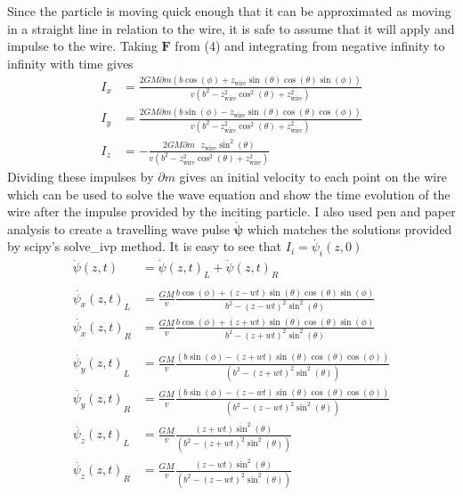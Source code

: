 \documentclass{report}
\begin{document}
Since the particle is moving quick enough that it can be approximated as moving in a straight line in relation
to the wire, it is safe to assume that it will apply and impulse to the wire. Taking $\mathbf{F}$ from (4) and 
integrating from negative infinity to infinity with time gives
\begin{align}
    I_x &= \frac{2 G M \partial m (b \cos (\phi )+z_{\text{wire}} \sin (\theta ) \cos (\theta ) \sin (\phi ))}{v \left(b^2-z_{\text{wire}}^2 \cos ^2(\theta )+z_{\text{wire}}^2\right)}\\
    I_y &= \frac{2 G M \partial m (b \sin (\phi )-z_{\text{wire}} \sin (\theta ) \cos (\theta ) \cos (\phi ))}{v \left(b^2-z_{\text{wire}}^2 \cos ^2(\theta )+z_{\text{wire}}^2\right)}\\
    I_z &= -\frac{2 G M \partial m \text{ } z_{\text{wire}} \sin ^2(\theta )}{v \left(b^2-z_{\text{wire}}^2 \cos ^2(\theta )+z_{\text{wire}}^2\right)}
\end{align}
Dividing these impulses by $\partial m$ gives an initial velocity to each point on the wire which can be used to 
solve the wave equation and show the time evolution of the wire after the impulse provided by the inciting particle.
I also used pen and paper analysis to create a travelling wave pulse $\dot{\mathbf{\psi}}$ which matches the solutions provided
by scipy's solve\_ivp method. It is easy to see that  $I_i = \dot{\psi_i} (z, 0)$
\begin{align}
    \dot{\psi} (z, t) &= {\dot{\psi} (z, t)}_L + {\dot{\psi} (z, t)}_R\\
    \nonumber\\
    \nonumber {\dot{\psi_x} (z, t)}_L &= \frac{G M}{v} \frac{b \cos (\phi )+ (z - w t) \sin (\theta ) \cos (\theta ) \sin (\phi )}{b^2-{(z - w t)}^2 \sin ^2(\theta )}\\
    \nonumber {\dot{\psi_x} (z, t)}_R &= \frac{G M}{v} \frac{b \cos (\phi )+ (z + w t) \sin (\theta ) \cos (\theta ) \sin (\phi )}{b^2-{(z + w t)}^2 \sin ^2(\theta )}\\
    \nonumber\\
    \nonumber {\dot{\psi_y} (z, t)}_L &= \frac{G M}{v} \frac{(b \sin (\phi )-{(z + w t)} \sin (\theta ) \cos (\theta ) \cos (\phi ))}{\left(b^2-{(z + w t)}^2 \sin ^2(\theta )\right)}\\
    \nonumber {\dot{\psi_y} (z, t)}_R &= \frac{G M}{v} \frac{(b \sin (\phi )-{(z - w t)} \sin (\theta ) \cos (\theta ) \cos (\phi ))}{\left(b^2-{(z - w t)}^2 \sin ^2(\theta )\right)}
    \nonumber\\
    \nonumber {\dot{\psi_z} (z, t)}_L &= \frac{G M}{v} \frac{{(z + w t)} \sin ^2(\theta )}{\left(b^2-{(z + w t)}^2 \sin ^2(\theta )\right)}\\
    \nonumber {\dot{\psi_z} (z, t)}_R &= \frac{G M}{v} \frac{{(z - w t)} \sin ^2(\theta )}{\left(b^2-{(z - w t)}^2 \sin ^2(\theta )\right)}
\end{align}
\end{document}
